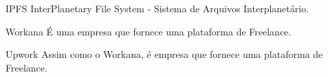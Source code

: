 \begin{siglas}
    \item[IPFS] InterPlanetary File System - Sistema de Arquivos Interplanetário.
    \item[Workana] É uma empresa que fornece uma plataforma de Freelance.
    \item[Upwork] Assim como o Workana, é empresa que fornece uma plataforma de Freelance.
\end{siglas}